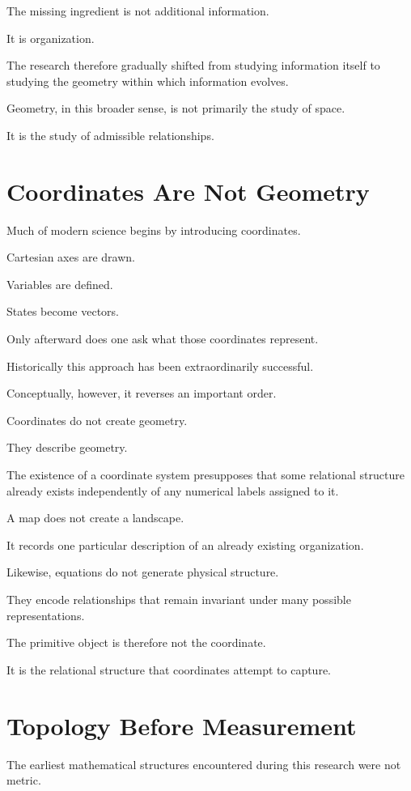 \documentclass[11pt,oneside]{book}
\numberwithin{equation}{chapter}
\theoremstyle{definition}
\theoremstyle{plain}
\begin{document}
The missing ingredient is not additional information.

It is organization.

The research therefore gradually shifted from studying information itself to
studying the geometry within which information evolves.

Geometry, in this broader sense, is not primarily the study of space.

It is the study of admissible relationships.

\section{Coordinates Are Not Geometry}

Much of modern science begins by introducing coordinates.

Cartesian axes are drawn.

Variables are defined.

States become vectors.

Only afterward does one ask what those coordinates represent.

Historically this approach has been extraordinarily successful.

Conceptually, however, it reverses an important order.

Coordinates do not create geometry.

They describe geometry.

The existence of a coordinate system presupposes that some relational
structure already exists independently of any numerical labels assigned to
it.

A map does not create a landscape.

It records one particular description of an already existing organization.

Likewise, equations do not generate physical structure.

They encode relationships that remain invariant under many possible
representations.

The primitive object is therefore not the coordinate.

It is the relational structure that coordinates attempt to capture.

\section{Topology Before Measurement}

The earliest mathematical structures encountered during this research were
not metric.
\end{document}

